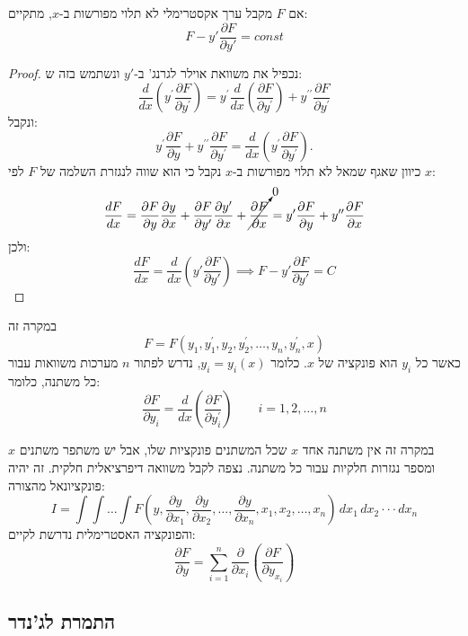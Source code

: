 \documentclass{tstextbook}
\begin{document}
\begin{theorem}
אם \(F\) מקבל ערך אקסטרימלי לא תלוי מפורשות ב-\(x\), מתקיים:
$$F-y'\frac{\partial F}{\partial y'}=const$$

\end{theorem}
\begin{proof}
נכפיל את משוואת אוילר לגרנג' ב-\(y'\) ונשתמש בזה ש:
$${\frac{d}{d x}}\left(y^{\prime}{\frac{\partial F}{\partial y^{\prime}}}\right)=y^{\prime}{\frac{d}{d x}}\left({\frac{\partial F}{\partial y^{\prime}}}\right)+y^{\prime\prime}{\frac{\partial F}{\partial y^{\prime}}}$$
ונקבל:
$$y^{\prime}{\frac{\partial F}{\partial y}}+y^{\prime\prime}{\frac{\partial F}{\partial y^{\prime}}}={\frac{d}{d x}}\left(y^{\prime}{\frac{\partial F}{\partial y^{\prime}}}\right).$$
כיוון שאגף שמאל לא תלוי מפורשות ב-\(x\) נקבל כי הוא שווה לנגזרת השלמה של \(F\) לפי \(x\):
$$\frac{dF}{dx}=\frac{\partial F}{\partial y}\frac{\partial y}{\partial x}+\frac{\partial F}{\partial y'}\frac{\partial y'}{\partial x}+\cancelto{ 0 }{ \frac{\partial F}{\partial x} }=y'\frac{\partial F}{\partial y}+y''\frac{\partial F}{\partial x}$$
ולכן:
$$\frac{dF}{dx}=\frac{d}{dx}\left( y'\frac{\partial F}{\partial y'} \right)\implies F-y'\frac{\partial F}{\partial y'}=C$$

\end{proof}
\begin{definition}
במקרה זה 
$$F=F(y_{1},y_{1}^{\prime},y_{2},y_{2}^{\prime},\ldots,y_{n},y_{n}^{\prime},x)$$
כאשר כל \(y_{i}\) הוא פונקציה של \(x\). כלומר \(y_{i}=y_{i}(x)\), נדרש לפתור \(n\) מערכות משוואות עבור כל משתנה, כלומר:
$$\frac{\partial F}{\partial y_{i}}=\frac{d}{d x}\left(\frac{\partial F}{\partial y_{i}^{\prime}}\right)\qquad i=1,2,\ldots,n$$

\end{definition}
\begin{definition}
במקרה זה אין משתנה אחד \(x\) שכל המשתנים פונקציות שלו, אבל יש משתפר משתנים \(x\) ומספר נגזרות חלקיות עבור כל משתנה. נצפה לקבל משוואה דיפרציאלית חלקית. זה יהיה פונקציונאל מהצורה:
$$I=\int\int\dots\int F\left(y,{\frac{\partial y}{\partial x_{1}}},{\frac{\partial y}{\partial x_{2}}},\ldots,{\frac{\partial y}{\partial x_{n}}},x_{1},x_{2},\ldots,x_{n}\right)\,d x_{1}\,d x_{2}\cdot\cdot\cdot d x_{n}$$
והפונקציה האסטרימלית נדרשת לקיים:
$${\frac{\partial F}{\partial y}}=\sum_{i=1}^{n}{\frac{\partial}{\partial x_{i}}}\left({\frac{\partial F}{\partial y_{x_{i}}}}\right)$$

\end{definition}
\subsection{התמרת לג'נדר}
\end{document}
